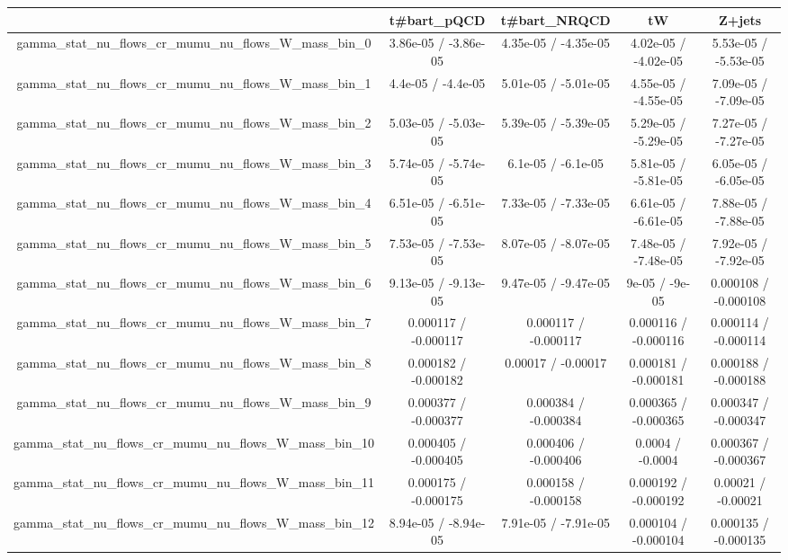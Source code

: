 \documentclass[10pt]{article}
\begin{document}
\begin{table}[htbp]
\begin{center}
\begin{tabular}{|c|c|c|c|c|}
\hline 
      & t#bar{t}_{pQCD}      & t#bar{t}_{NRQCD}      & tW      & Z+jets \\ 
\hline 
  gamma_stat_nu_flows_cr_mumu_nu_flows_W_mass_bin_0 & 3.86e-05 / -3.86e-05 & 4.35e-05 / -4.35e-05 & 4.02e-05 / -4.02e-05 & 5.53e-05 / -5.53e-05 \\ 
  gamma_stat_nu_flows_cr_mumu_nu_flows_W_mass_bin_1 & 4.4e-05 / -4.4e-05 & 5.01e-05 / -5.01e-05 & 4.55e-05 / -4.55e-05 & 7.09e-05 / -7.09e-05 \\ 
  gamma_stat_nu_flows_cr_mumu_nu_flows_W_mass_bin_2 & 5.03e-05 / -5.03e-05 & 5.39e-05 / -5.39e-05 & 5.29e-05 / -5.29e-05 & 7.27e-05 / -7.27e-05 \\ 
  gamma_stat_nu_flows_cr_mumu_nu_flows_W_mass_bin_3 & 5.74e-05 / -5.74e-05 & 6.1e-05 / -6.1e-05 & 5.81e-05 / -5.81e-05 & 6.05e-05 / -6.05e-05 \\ 
  gamma_stat_nu_flows_cr_mumu_nu_flows_W_mass_bin_4 & 6.51e-05 / -6.51e-05 & 7.33e-05 / -7.33e-05 & 6.61e-05 / -6.61e-05 & 7.88e-05 / -7.88e-05 \\ 
  gamma_stat_nu_flows_cr_mumu_nu_flows_W_mass_bin_5 & 7.53e-05 / -7.53e-05 & 8.07e-05 / -8.07e-05 & 7.48e-05 / -7.48e-05 & 7.92e-05 / -7.92e-05 \\ 
  gamma_stat_nu_flows_cr_mumu_nu_flows_W_mass_bin_6 & 9.13e-05 / -9.13e-05 & 9.47e-05 / -9.47e-05 & 9e-05 / -9e-05 & 0.000108 / -0.000108 \\ 
  gamma_stat_nu_flows_cr_mumu_nu_flows_W_mass_bin_7 & 0.000117 / -0.000117 & 0.000117 / -0.000117 & 0.000116 / -0.000116 & 0.000114 / -0.000114 \\ 
  gamma_stat_nu_flows_cr_mumu_nu_flows_W_mass_bin_8 & 0.000182 / -0.000182 & 0.00017 / -0.00017 & 0.000181 / -0.000181 & 0.000188 / -0.000188 \\ 
  gamma_stat_nu_flows_cr_mumu_nu_flows_W_mass_bin_9 & 0.000377 / -0.000377 & 0.000384 / -0.000384 & 0.000365 / -0.000365 & 0.000347 / -0.000347 \\ 
  gamma_stat_nu_flows_cr_mumu_nu_flows_W_mass_bin_10 & 0.000405 / -0.000405 & 0.000406 / -0.000406 & 0.0004 / -0.0004 & 0.000367 / -0.000367 \\ 
  gamma_stat_nu_flows_cr_mumu_nu_flows_W_mass_bin_11 & 0.000175 / -0.000175 & 0.000158 / -0.000158 & 0.000192 / -0.000192 & 0.00021 / -0.00021 \\ 
  gamma_stat_nu_flows_cr_mumu_nu_flows_W_mass_bin_12 & 8.94e-05 / -8.94e-05 & 7.91e-05 / -7.91e-05 & 0.000104 / -0.000104 & 0.000135 / -0.000135 \\ 

\end{tabular}
\end{center}
\end{table}
\end{document}
